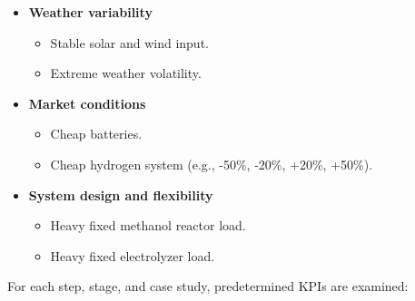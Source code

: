 \begin{itemize}
\item \textbf{Weather variability}
\begin{itemize}
\item Stable solar and wind input.
\item Extreme weather volatility.
\end{itemize}
\item \textbf{Market conditions}
\begin{itemize}
\item Cheap batteries.
\item Cheap hydrogen system (e.g., -50\%, -20\%, +20\%, +50\%).
\end{itemize}
\item \textbf{System design and flexibility}
\begin{itemize}
\item Heavy fixed methanol reactor load.
\item Heavy fixed electrolyzer load.
\end{itemize}
\end{itemize}

For each step, stage, and case study, predetermined KPIs are examined:

